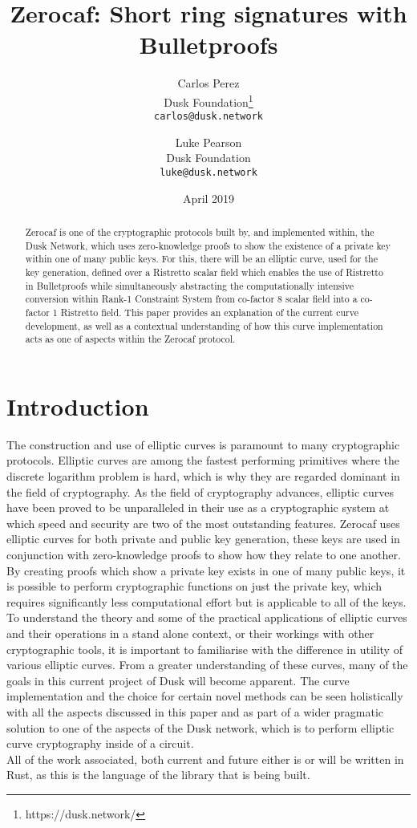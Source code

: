 \documentclass{article}
\title{Zerocaf: Short ring signatures with Bulletproofs}
\author{
  Carlos Perez\\
  Dusk Foundation\footnote{https://dusk.network/}\\
  \texttt{carlos@dusk.network}
  \and
  Luke Pearson\\
  Dusk Foundation\\
  \texttt{luke@dusk.network}
}
\date{April 2019}
\begin{document}
\maketitle
\thispagestyle{empty}
\pagestyle{empty}

\begin{abstract}
Zerocaf is one of the cryptographic protocols built by, and implemented within, the Dusk Network, which uses zero-knowledge proofs to show the existence of a private key within one of many public keys. For this, there will be an elliptic curve, used for the key generation, defined over a Ristretto scalar field which enables the use of Ristretto in Bulletproofs while simultaneously abstracting the computationally intensive conversion within Rank-1 Constraint System from co-factor 8 scalar field into a co-factor 1 Ristretto field. This paper provides an explanation of the current curve development, as well as a contextual understanding of how this curve implementation acts as one of aspects within the Zerocaf protocol.


\end{abstract}

\newpage

\tableofcontents

\newpage

\section{Introduction}
The construction and use of elliptic curves is paramount to many cryptographic protocols. Elliptic curves are among the fastest performing primitives where the discrete logarithm problem is hard, which is why they are regarded dominant in the field of cryptography. As the field of cryptography advances, elliptic curves have been proved to be unparalleled in their use as a cryptographic system at which speed and security are two of the most outstanding features. Zerocaf uses elliptic curves for both private and public key generation, these keys are used in conjunction with zero-knowledge proofs to show how they relate to one another. By creating proofs which show a private key exists in one of many public keys, it is possible to perform cryptographic functions on just the private key, which requires significantly less computational effort but is applicable to all of the keys.  To understand the theory and some of the practical applications of elliptic curves and their operations in a stand alone context, or their workings with other cryptographic tools, it is important to familiarise with the difference in utility of various elliptic curves. From a greater understanding of these curves, many of the goals in this current project of Dusk will become apparent.  The curve implementation and the choice for certain novel methods can be seen holistically with all the aspects discussed in this paper and as part of a wider pragmatic solution to one of the aspects of the Dusk network, which is to perform elliptic curve cryptography inside of a circuit. \\
All of the work associated, both current and future either is or will be written in Rust, as this is the language of the library that is being built.
\end{document}
